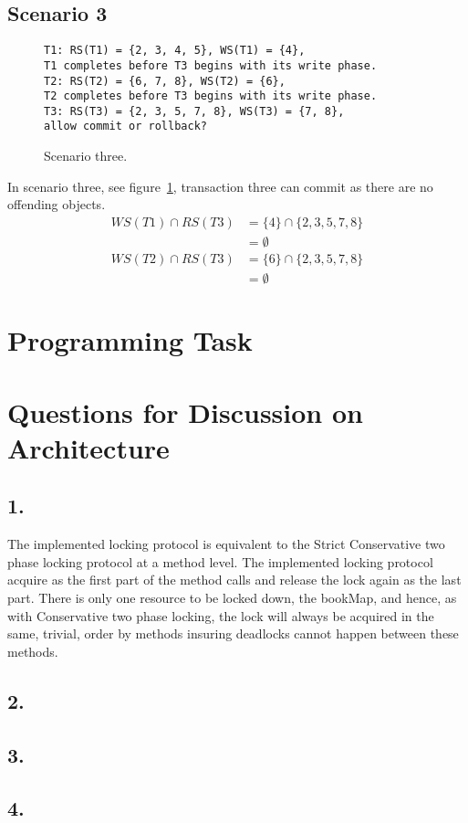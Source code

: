 \documentclass[12pt]{article}
\begin{document}
\subsection*{Scenario 3}
\begin{figure}[h!]
\texttt{T1: RS(T1) = \{2, 3, 4, 5\}, WS(T1) = \{4\},\\
T1 completes before T3 begins with its write phase.\\
T2: RS(T2) = \{6, 7, 8\}, WS(T2) = \{6\},\\
T2 completes before T3 begins with its write phase.\\
T3: RS(T3) = \{2, 3, 5, 7, 8\}, WS(T3) = \{7, 8\},\\
allow commit or rollback?}
\caption{Scenario three.}
\label{sc3}
\end{figure}
In scenario three, see figure~\ref{sc3}, transaction three can commit as there are no offending objects. 
\begin{align}
WS(T1) \cap RS(T3) &= \{4\} \cap \{2, 3, 5, 7, 8\}\\
&= \emptyset\\
WS(T2) \cap RS(T3) &= \{6\} \cap \{2, 3, 5, 7, 8\}\\
&= \emptyset
\end{align}
\section*{Programming Task}
\section*{Questions for Discussion on Architecture} %
\subsection*{1.} %
The implemented locking protocol is equivalent to the Strict Conservative two phase locking protocol at a method level. The implemented locking protocol acquire as the first part of the method calls and release the lock again as the last part. There is only one resource to be locked down, the bookMap, and hence, as with Conservative two phase locking, the lock will always be acquired in the same, trivial, order by methods insuring deadlocks cannot happen between these methods.
\subsection*{2.} %

\subsection*{3.} %

\subsection*{4.} %
\end{document}

